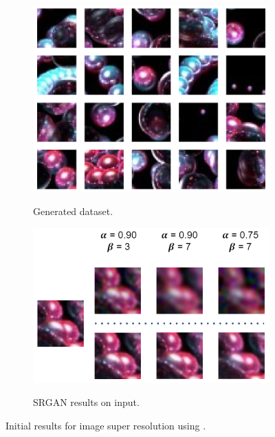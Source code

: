 \documentclass{article}
\begin{document}
\begin{figure}[h!]
\centering
\begin{subfigure}{0.45\textwidth}
\begin{center}
\begin{minipage}[t]{0.9\linewidth}
\begin{centering}
{\includegraphics[width=\linewidth]{srgan_frame_samples.png}}
\caption{Generated dataset.}
\label{fig:frame_dataset}
\end{centering}
\end{minipage}
\end{center}
\end{subfigure}
\begin{subfigure}{0.45\textwidth}
\begin{center}
\begin{minipage}[t]{0.95\linewidth}
\begin{centering}
{\includegraphics[width=\linewidth]{srgan_frame_outputs.png}}
\caption{SRGAN results on input.}
\label{fig:srgan_outputs}
\end{centering}
\end{minipage}
\end{center}
\end{subfigure}
\caption{Initial results for image super resolution using \cite{srgan}.}
\label{fig:initial_results}
\end{figure}
\end{document}

